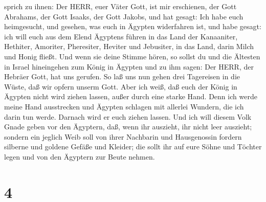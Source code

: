 sprich zu ihnen: Der HERR, euer Väter Gott, ist mir erschienen, der Gott
Abrahams, der Gott Isaaks, der Gott Jakobs, und hat gesagt: Ich habe
euch heimgesucht, und gesehen, was euch in Ägypten widerfahren ist,
 und habe gesagt: ich will euch aus dem Elend Ägyptens
führen in das Land der Kanaaniter, Hethiter, Amoriter, Pheresiter,
Heviter und Jebusiter, in das Land, darin Milch und Honig fließt.
 Und wenn sie deine Stimme hören, so sollst du und die
Ältesten in Israel hineingehen zum König in Ägypten und zu ihm sagen:
Der HERR, der Hebräer Gott, hat uns gerufen. So laß uns nun gehen drei
Tagereisen in die Wüste, daß wir opfern unserm Gott.  Aber
ich weiß, daß euch der König in Ägypten nicht wird ziehen lassen, außer
durch eine starke Hand.  Denn ich werde meine Hand
ausstrecken und Ägypten schlagen mit allerlei Wundern, die ich darin tun
werde. Darnach wird er euch ziehen lassen.  Und ich will
diesem Volk Gnade geben vor den Ägyptern, daß, wenn ihr auszieht, ihr
nicht leer auszieht;  sondern ein jeglich Weib soll von
ihrer Nachbarin und Hausgenossin fordern silberne und goldene Gefäße und
Kleider; die sollt ihr auf eure Söhne und Töchter legen und von den
Ägyptern zur Beute nehmen.

\hypertarget{section-3}{%
\section{4}\label{section-3}}


